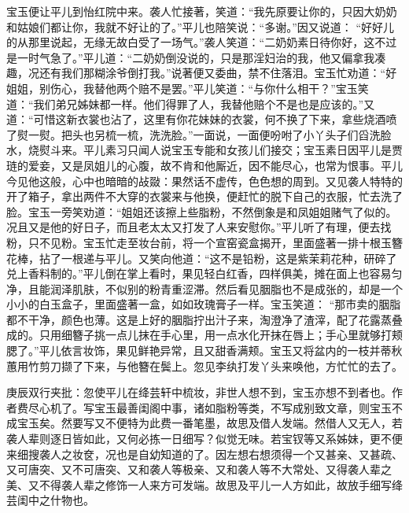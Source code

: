 \begin{parag}
    宝玉便让平儿到怡红院中来。袭人忙接著，笑道：“我先原要让你的，只因大奶奶和姑娘们都让你，我就不好让的了。”平儿也陪笑说：“多谢。”因又说道： “好好儿的从那里说起，无缘无故白受了一场气。”袭人笑道：“二奶奶素日待你好，这不过是一时气急了。”平儿道：“二奶奶倒没说的，只是那淫妇治的我，他又偏拿我凑趣，况还有我们那糊涂爷倒打我。”说著便又委曲，禁不住落泪。宝玉忙劝道：“好姐姐，别伤心，我替他两个赔不是罢。”平儿笑道：“与你什么相干？”宝玉笑道：“我们弟兄姊妹都一样。他们得罪了人，我替他赔个不是也是应该的。”又道：“可惜这新衣裳也沾了，这里有你花妹妹的衣裳，何不换了下来，拿些烧酒喷了熨一熨。把头也另梳一梳，洗洗脸。”一面说，一面便吩咐了小丫头子们舀洗脸水，烧熨斗来。平儿素习只闻人说宝玉专能和女孩儿们接交；宝玉素日因平儿是贾琏的爱妾，又是凤姐儿的心腹，故不肯和他厮近，因不能尽心，也常为恨事。平儿今见他这般，心中也暗暗的敁敠：果然话不虚传，色色想的周到。又见袭人特特的开了箱子，拿出两件不大穿的衣裳来与他换，便赶忙的脱下自己的衣服，忙去洗了脸。宝玉一旁笑劝道：“姐姐还该擦上些脂粉，不然倒象是和凤姐姐赌气了似的。况且又是他的好日子，而且老太太又打发了人来安慰你。”平儿听了有理，便去找粉，只不见粉。宝玉忙走至妆台前，将一个宣窑瓷盒揭开，里面盛著一排十根玉簪花棒，拈了一根递与平儿。又笑向他道：“这不是铅粉，这是紫茉莉花种，研碎了兑上香料制的。”平儿倒在掌上看时，果见轻白红香，四样俱美，摊在面上也容易匀净，且能润泽肌肤，不似别的粉青重涩滞。然后看见胭脂也不是成张的，却是一个小小的白玉盒子，里面盛著一盒，如如玫瑰膏子一样。宝玉笑道： “那市卖的胭脂都不干净，颜色也薄。这是上好的胭脂拧出汁子来，淘澄净了渣滓，配了花露蒸叠成的。只用细簪子挑一点儿抹在手心里，用一点水化开抹在唇上；手心里就够打颊腮了。”平儿依言妆饰，果见鲜艳异常，且又甜香满颊。宝玉又将盆内的一枝并蒂秋蕙用竹剪刀撷了下来，与他簪在鬓上。忽见李纨打发丫头来唤他，方忙忙的去了。\begin{note}庚辰双行夹批：忽使平儿在绛芸轩中梳妆，非世人想不到，宝玉亦想不到者也。作者费尽心机了。写宝玉最善闺阁中事，诸如脂粉等类，不写成别致文章，则宝玉不成宝玉矣。然要写又不便特为此费一番笔墨，故思及借人发端。然借人又无人，若袭人辈则逐日皆如此，又何必拣一日细写？似觉无味。若宝钗等又系姊妹，更不便来细搜袭人之妆奁，况也是自幼知道的了。因左想右想须得一个又甚亲、又甚疏、又可唐突、又不可唐突、又和袭人等极亲、又和袭人等不大常处、又得袭人辈之美、又不得袭人辈之修饰一人来方可发端。故思及平儿一人方如此，故放手细写绛芸闺中之什物也。\end{note}
\end{parag}


